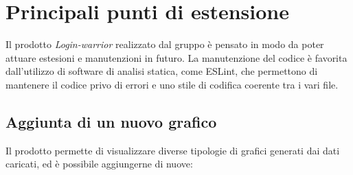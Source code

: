 \chapter{Principali punti di estensione}

Il prodotto \textit{Login-warrior} realizzato dal gruppo è pensato in modo da poter attuare estesioni e manutenzioni in futuro. La manutenzione del codice è favorita dall'utilizzo di software di analisi statica, come ESLint, che permettono di mantenere il codice privo di errori e uno stile di codifica coerente tra i vari file.

\section{Aggiunta di un nuovo grafico}
Il prodotto permette di visualizzare diverse tipologie di grafici generati dai dati caricati, ed è possibile aggiungerne di nuove:
